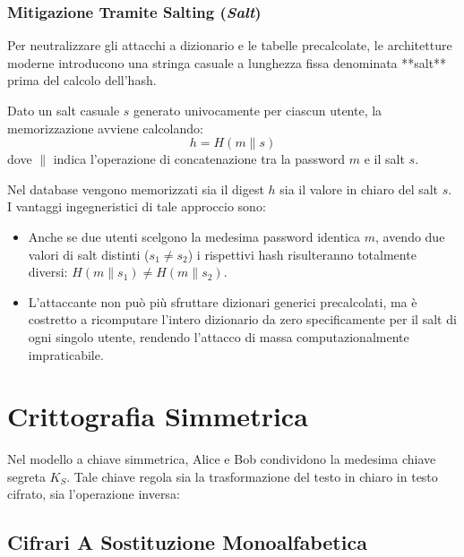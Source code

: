 \documentclass[11pt, a4paper]{article}
\begin{document}
\subsubsection{Mitigazione Tramite Salting (\emph{Salt})}
Per neutralizzare gli attacchi a dizionario e le tabelle precalcolate, le architetture moderne introducono una stringa casuale a lunghezza fissa denominata **salt** prima del calcolo dell'hash.

Dato un salt casuale $s$ generato univocamente per ciascun utente, la memorizzazione avviene calcolando:
\begin{equation}
\boxed{h = H(m \parallel s)}
\end{equation}
dove $\parallel$ indica l'operazione di concatenazione tra la password $m$ e il salt $s$.

Nel database vengono memorizzati sia il digest $h$ sia il valore in chiaro del salt $s$. I vantaggi ingegneristici di tale approccio sono:
\begin{itemize}[noitemsep]
    \item Anche se due utenti scelgono la medesima password identica $m$, avendo due valori di salt distinti ($s_1 \neq s_2$) i rispettivi hash risulteranno totalmente diversi: $H(m \parallel s_1) \neq H(m \parallel s_2)$.
    \item L'attaccante non può più sfruttare dizionari generici precalcolati, ma è costretto a ricomputare l'intero dizionario da zero specificamente per il salt di ogni singolo utente, rendendo l'attacco di massa computazionalmente impraticabile.
\end{itemize}

\newpage

\section{Crittografia Simmetrica}

Nel modello a chiave simmetrica, Alice e Bob condividono la medesima chiave segreta $K_S$. Tale chiave regola sia la trasformazione del testo in chiaro in testo cifrato, sia l'operazione inversa:


\subsection{Cifrari A Sostituzione Monoalfabetica}
\end{document}
